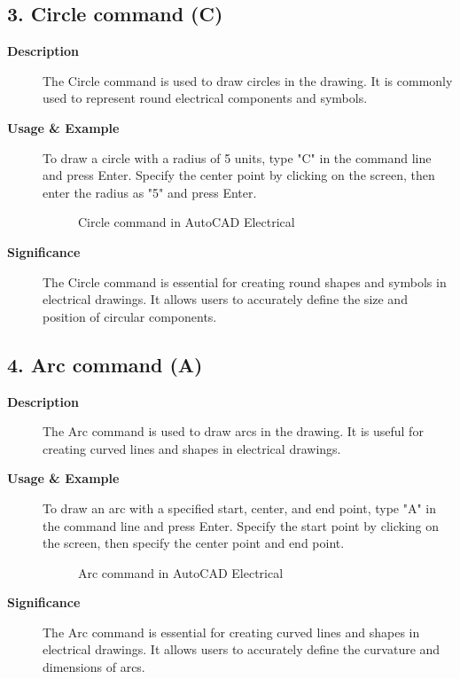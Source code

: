 \documentclass[12pt]{article}
\begin{document}
\subsection*{3. Circle command (C)}
\begin{description}
    \item [\textbf{Description}] The Circle command is used to draw circles in the drawing. It is commonly used to represent round electrical components and symbols.
    \item [\textbf{Usage \& Example}] To draw a circle with a radius of 5 units, type "C" in the command line and press Enter. Specify the center point by clicking on the screen, then enter the radius as "5" and press Enter.
          \begin{figure}[H]
              \centering
              \caption{Circle command in AutoCAD Electrical}
          \end{figure}
    \item [\textbf{Significance}] The Circle command is essential for creating round shapes and symbols in electrical drawings. It allows users to accurately define the size and position of circular components.
\end{description}

\subsection*{4. Arc command (A)}
\begin{description}
    \item [\textbf{Description}] The Arc command is used to draw arcs in the drawing. It is useful for creating curved lines and shapes in electrical drawings.
    \item [\textbf{Usage \& Example}] To draw an arc with a specified start, center, and end point, type "A" in the command line and press Enter. Specify the start point by clicking on the screen, then specify the center point and end point.
          \begin{figure}[H]
              \centering
              \caption{Arc command in AutoCAD Electrical}
          \end{figure}
    \item [\textbf{Significance}] The Arc command is essential for creating curved lines and shapes in electrical drawings. It allows users to accurately define the curvature and dimensions of arcs.
\end{description}
\end{document}
